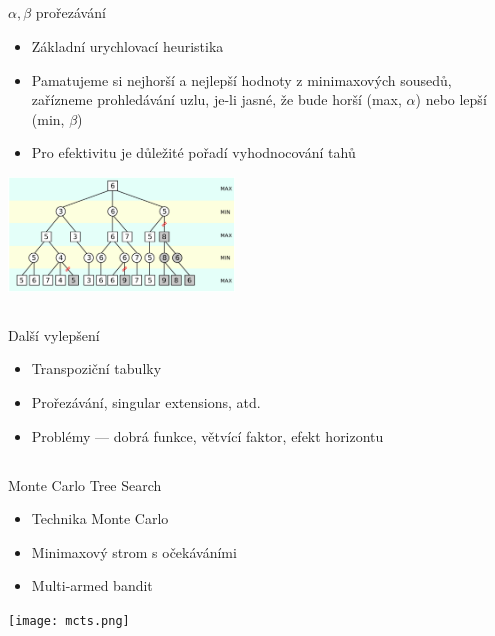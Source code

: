 \documentclass{beamer}
\begin{document}
\subsection{}
\begin{frame}{$\alpha,\beta$ prořezávání}
\begin{itemize}
\item Základní urychlovací heuristika
\item Pamatujeme si nejhorší a nejlepší hodnoty z minimaxových sousedů, zařízneme prohledávání uzlu, je-li jasné, že bude horší (max, $\alpha$) nebo lepší (min, $\beta$)
\item Pro efektivitu je důležité pořadí vyhodnocování tahů
\end{itemize}
\begin{center}
\includegraphics[width=6cm]{AB_pruning.pdf}
\end{center}
\end{frame}

\subsection{}
\begin{frame}{Další vylepšení}
\begin{itemize}
\item Transpoziční tabulky
\item Prořezávání, singular extensions, atd.
\item Problémy --- dobrá funkce, větvící faktor, efekt horizontu
\end{itemize}
\end{frame}

\subsection{}
\begin{frame}{Monte Carlo Tree Search}
\begin{itemize}
\item Technika Monte Carlo
\item Minimaxový strom s očekáváními
\item Multi-armed bandit
\end{itemize}
\begin{center}
\texttt{[image: mcts.png]}
\end{center}
\end{frame}
\end{document}
